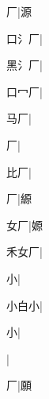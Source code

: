 \begin{multicols}{2}
{{厂}|{\cjk{}源}\par
{\cjk{}口{\cnxHanaA{}氵}厂}|{}\par
{\cjk{}黑{\cnxHanaA{}氵}厂}|{}\par
{\cjk{}口{\cnxHanaA{}冖}厂}|{}\par
{\cjk{}{\cnsym{}　}马厂}|{}\par
{厂}|{}\par
{比厂}|{}\par
{厂}|{\cjk{}縓}\par
{\cjk{}{\cnsym{}　}女厂}|{\cjk{}嫄}\par
{\cjk{}禾女厂}|{}\par
{\cjk{}{\cnsym{}　}{\cnsym{}　}小}|{}\par
{\cjk{}小白小}|{}\par
{小}|{}\par
{\cjk{}{\cnsym{}　}{\cnsym{}　}{\cnsym{}　}}|{}\par
{\cjk{}{\cnsym{}　}{\cnsym{}　}厂}|{\cjk{}願}\par
}
\end{multicols}

